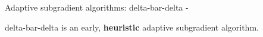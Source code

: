 

\begin{frame}[t,allowframebreaks]{
    Adaptive subgradient algorithms: delta-bar-delta -}

    \Gls{delta-bar-delta} \cite{Jacobs:1988dbd}
    is an early, {\bf heuristic}
    \gls{adaptive subgradient} algorithm.\\

    

\end{frame}